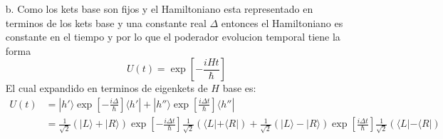 \documentclass[a4paper]{article}
\begin{document}
\begin{answer}
\begin{itemize}
        \item[b.] Como los kets base son fijos y el Hamiltoniano esta representado en terminos de los kets base y una constante real $\Delta$
        entonces el Hamiltoniano es constante en el tiempo y por lo que el poderador evolucion temporal tiene la forma
        $$U(t) = \exp{\left[-\frac{iHt}{\hbar}\right]}$$  
        El cual expandido en terminos de eigenkets de $H$ base es:
        \begin{align*}
            U(t) &= |h'\rangle \exp{\left[-\frac{i\Delta}{\hbar}\right]} \langle h'| + |h''\rangle \exp{\left[\frac{i\Delta t}{\hbar}\right]} \langle h''|\\
            &= \frac{1}{\sqrt{2}}(|L \rangle + |R\rangle) \exp{\left[-\frac{i\Delta t}{\hbar}\right]} \frac{1}{\sqrt{2}}(\langle L| + \langle R|)+ \frac{1}{\sqrt{2}}(|L \rangle - |R\rangle) \exp{\left[\frac{i\Delta t}{\hbar}\right]} \frac{1}{\sqrt{2}}(\langle L| - \langle R|)\\
        \end{align*}
    \end{itemize}

    \end{answer}
\end{document}
